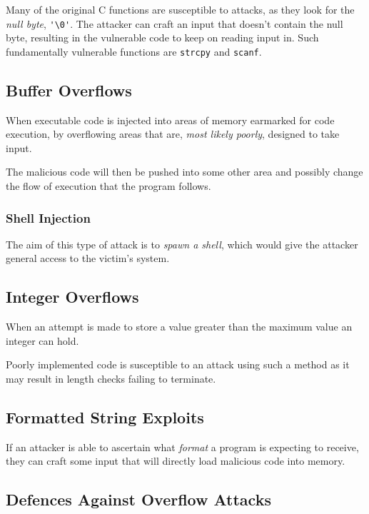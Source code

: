 \documentclass{article}
\begin{document}
Many of the original C functions are susceptible to attacks, as they look for the \textit{null byte}, \verb|'\0'|. The attacker can craft an input that doesn't contain the null byte, resulting in the vulnerable code to keep on reading input in. Such fundamentally vulnerable functions are \texttt{strcpy} and \texttt{scanf}.

\subsection{Buffer Overflows}

When executable code is injected into areas of memory earmarked for code execution, by overflowing areas that are, \textit{most likely poorly}, designed to take input.

The malicious code will then be pushed into some other area and possibly change the flow of execution that the program follows.

\subsubsection{Shell Injection}

The aim of this type of attack is to \textit{spawn a shell}, which would give the attacker general access to the victim's system.

\subsection{Integer Overflows}

When an attempt is made to store a value greater than the maximum value an integer can hold.

Poorly implemented code is susceptible to an attack using such a method as it may result in length checks failing to terminate.

\subsection{Formatted String Exploits}

If an attacker is able to ascertain what \textit{format} a program is expecting to receive, they can craft some input that will directly load malicious code into memory.

\subsection{Defences Against Overflow Attacks}
\end{document}
